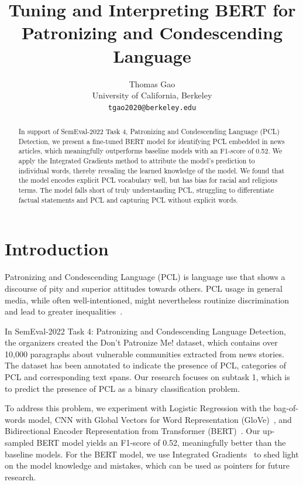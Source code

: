\documentclass[11pt]{article}
\title{Tuning and Interpreting BERT for Patronizing and Condescending Language}
\author{Thomas Gao \\
  University of California, Berkeley \\
  \texttt{tgao2020@berkeley.edu} \\}
\begin{document}
\maketitle
\begin{abstract}
In support of SemEval-2022 Task 4, Patronizing and Condescending Language (PCL) Detection, we present a fine-tuned BERT model for identifying PCL embedded in news articles, which meaningfully outperforms baseline models with an F1-score of 0.52. We apply the Integrated Gradients method to attribute the model’s prediction to individual words, thereby revealing the learned knowledge of the model. We found that the model encodes explicit PCL vocabulary well, but has bias for racial and religious terms. The model falls short of truly understanding PCL, struggling to differentiate factual statements and PCL and capturing PCL without explicit words.
\end{abstract}

\section{Introduction}

Patronizing and Condescending Language (PCL) is language use that shows a discourse of pity and superior attitudes towards others. PCL usage in general media, while often well-intentioned, might nevertheless routinize discrimination and lead to greater inequalities~\cite{perez2020don}.

In SemEval-2022 Task 4: Patronizing and Condescending Language Detection, the organizers created the Don’t Patronize Me! dataset, which contains over 10,000 paragraphs about vulnerable communities extracted from news stories. The dataset has been annotated to indicate the presence of PCL, categories of PCL and corresponding text spans. Our research focuses on subtask 1, which is to predict the presence of PCL as a binary classification problem.

To address this problem, we experiment with Logistic Regression with the bag-of-words model, CNN with Global Vectors for Word Representation (GloVe)~\cite{pennington2014glove}, and Bidirectional Encoder Representation from Transformer (BERT)~\cite{devlin2018bert}. Our up-sampled BERT model yields an F1-score of 0.52, meaningfully better than the baseline models. For the BERT model, we use Integrated Gradients~\cite{sundararajan2017axiomatic} to shed light on the model knowledge and mistakes, which can be used as pointers for future research. 
\end{document}
